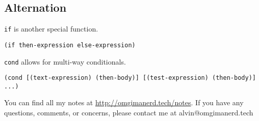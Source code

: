 \documentclass{math}
\begin{document}
\subsection*{Alternation}
\texttt{if} is another special function.
\begin{center}
  \texttt{(if then-expression else-expression)}
\end{center}
\texttt{cond} allows for multi-way conditionals.
\begin{center}
  \texttt{(cond
    [(text-expression) (then-body)] [(test-expression) (then-body)] ...)}
\end{center}

\begin{center}
  You can find all my notes at \url{http://omgimanerd.tech/notes}. If you have
  any questions, comments, or concerns, please contact me at
  alvin@omgimanerd.tech
\end{center}
\end{document}
